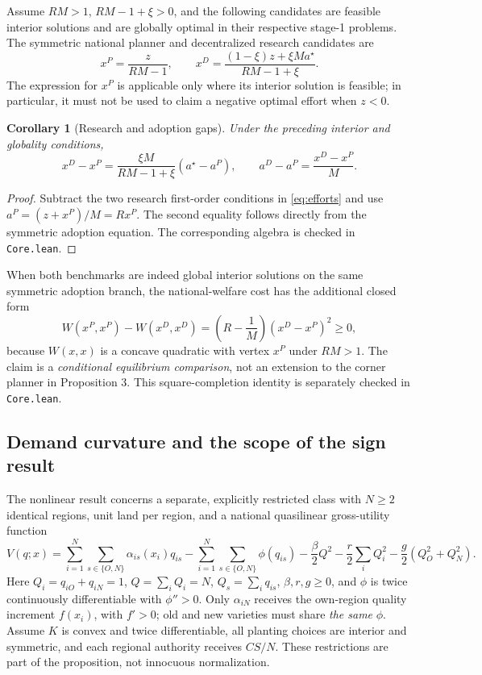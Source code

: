 \documentclass[11pt]{article}
\newtheorem{corollary}{Corollary}
\begin{document}
Assume $RM>1$, $RM-1+\xi>0$, and the following candidates are feasible interior solutions and are globally optimal in their respective stage-1 problems. The symmetric national planner and decentralized research candidates are
\begin{equation}
 x^P=\frac{z}{RM-1},\qquad
 x^D=\frac{(1-\xi)z+\xi M a^\star}{RM-1+\xi}.
 \label{eq:efforts}
\end{equation}
The expression for $x^P$ is applicable only where its interior solution is feasible; in particular, it must not be used to claim a negative optimal effort when $z<0$.

\begin{corollary}[Research and adoption gaps]
Under the preceding interior and globality conditions,
\begin{equation}
 x^D-x^P=\frac{\xi M}{RM-1+\xi}(a^\star-a^P),
 \qquad a^D-a^P=\frac{x^D-x^P}{M}.
 \label{eq:corollary}
\end{equation}
\end{corollary}
\begin{proof}
Subtract the two research first-order conditions in \eqref{eq:efforts} and use $a^P=(z+x^P)/M=Rx^P$. The second equality follows directly from the symmetric adoption equation. The corresponding algebra is checked in \texttt{Core.lean}.
\end{proof}

When both benchmarks are indeed global interior solutions on the same symmetric adoption branch, the national-welfare cost has the additional closed form
\begin{equation}
W(x^P,x^P)-W(x^D,x^D)
=\left(R-\frac{1}{M}\right)(x^D-x^P)^2\geq0,
\label{eq:interiorwelfarecost}
\end{equation}
because $W(x,x)$ is a concave quadratic with vertex $x^P$ under $RM>1$. The claim is a \emph{conditional equilibrium comparison}, not an extension to the corner planner in Proposition 3. This square-completion identity is separately checked in \texttt{Core.lean}.

\subsection{Demand curvature and the scope of the sign result}
The nonlinear result concerns a separate, explicitly restricted class with $N\geq2$ identical regions, unit land per region, and a national quasilinear gross-utility function
\begin{equation}
V(q;x)=\sum_{i=1}^{N}\sum_{s\in\{O,N\}}\alpha_{is}(x_i)q_{is}
-\sum_{i=1}^{N}\sum_{s\in\{O,N\}}\phi(q_{is})
-\frac{\beta}{2}Q^2-\frac{r}{2}\sum_iQ_i^2
-\frac{g}{2}(Q_O^2+Q_N^2).
\label{eq:nonlinearutility}
\end{equation}
Here $Q_i=q_{iO}+q_{iN}=1$, $Q=\sum_iQ_i=N$, $Q_s=\sum_iq_{is}$, $\beta,r,g\geq0$, and $\phi$ is twice continuously differentiable with $\phi''>0$. Only $\alpha_{iN}$ receives the own-region quality increment $f(x_i)$, with $f'>0$; old and new varieties must share \emph{the same} $\phi$. Assume $K$ is convex and twice differentiable, all planting choices are interior and symmetric, and each regional authority receives $CS/N$. These restrictions are part of the proposition, not innocuous normalization.
\end{document}
